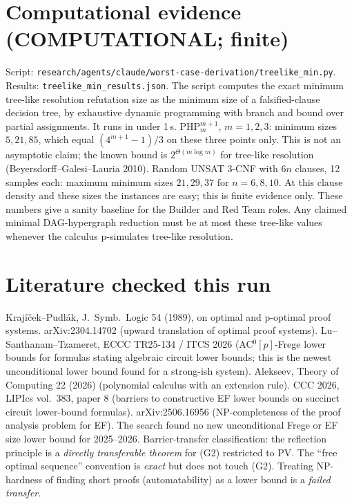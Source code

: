 \documentclass[11pt]{article}
\begin{document}
\section{Computational evidence (COMPUTATIONAL; finite)}
Script: \texttt{research/agents/claude/worst-case-derivation/treelike\_min.py}. Results: \texttt{treelike\_min\_results.json}. The script computes the exact minimum tree-like resolution refutation size as the minimum size of a falsified-clause decision tree, by exhaustive dynamic programming with branch and bound over partial assignments. It runs in under 1\,s.
PHP$^{m+1}_m$, $m=1,2,3$: minimum sizes $5, 21, 85$, which equal $(4^{m+1}-1)/3$ on these three points only. This is not an asymptotic claim; the known bound is $2^{\Theta(m\log m)}$ for tree-like resolution (Beyersdorff--Galesi--Lauria 2010).
Random UNSAT 3-CNF with $6n$ clauses, 12 samples each: maximum minimum sizes $21, 29, 37$ for $n=6,8,10$. At this clause density and these sizes the instances are easy; this is finite evidence only.
These numbers give a sanity baseline for the Builder and Red Team roles. Any claimed minimal DAG-hypergraph reduction must be at most these tree-like values whenever the calculus p-simulates tree-like resolution.

\section{Literature checked this run}
Krajíček--Pudlák, J.\ Symb.\ Logic 54 (1989), on optimal and p-optimal proof systems. arXiv:2304.14702 (upward translation of optimal proof systems). Lu--Santhanam--Tzameret, ECCC TR25-134 / ITCS 2026 (AC$^0[p]$-Frege lower bounds for formulas stating algebraic circuit lower bounds; this is the newest unconditional lower bound found for a strong-ish system). Alekseev, Theory of Computing 22 (2026) (polynomial calculus with an extension rule). CCC 2026, LIPIcs vol.\ 383, paper 8 (barriers to constructive EF lower bounds on succinct circuit lower-bound formulas). arXiv:2506.16956 (NP-completeness of the proof analysis problem for EF). The search found no new unconditional Frege or EF size lower bound for 2025--2026.
Barrier-transfer classification: the reflection principle is a \emph{directly transferable theorem} for (G2) restricted to PV. The ``free optimal sequence'' convention is \emph{exact} but does not touch (G2). Treating NP-hardness of finding short proofs (automatability) as a lower bound is a \emph{failed transfer}.
\end{document}
